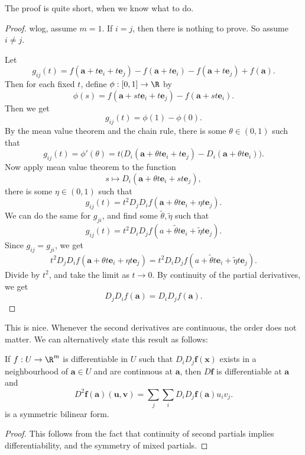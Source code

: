 \documentclass[a4paper]{article}
\begin{document}
The proof is quite short, when we know what to do.
\begin{proof}
  wlog, assume $m = 1$. If $i = j$, then there is nothing to prove. So assume $i \not =j$.

  Let
  \[
    g_{ij}(t) = f(\mathbf{a} + t \mathbf{e}_i + t \mathbf{e}_j) - f(\mathbf{a} + t \mathbf{e}_i) - f(\mathbf{a} + t \mathbf{e}_j) + f(\mathbf{a}).
  \]
  Then for each fixed $t$, define $\phi: [0, 1] \to \R$ by
  \[
    \phi(s) = f(\mathbf{a} + st \mathbf{e}_i + t \mathbf{e}_j) - f(\mathbf{a} + st \mathbf{e}_i).
  \]
  Then we get
  \[
    g_{ij}(t) = \phi(1) - \phi(0).
  \]
  By the mean value theorem and the chain rule, there is some $\theta \in (0, 1)$ such that
  \[
    g_{ij}(t) = \phi'(\theta) = t\Big(D_i(\mathbf{a} + \theta t \mathbf{e}_i + t \mathbf{e}_j) - D_i(\mathbf{a} + \theta t \mathbf{e}_i)\Big).
  \]
  Now apply mean value theorem to the function
  \[
    s \mapsto D_i (\mathbf{a} + \theta t \mathbf{e}_i + st \mathbf{e}_j),
  \]
  there is some $\eta \in (0, 1)$ such that
  \[
    g_{ij}(t) = t^2 D_j D_i f(\mathbf{a} + \theta t \mathbf{e}_i + \eta t \mathbf{e}_j).
  \]
  We can do the same for $g_{ji}$, and find some $\tilde{\theta}, \tilde{\eta}$ such that
  \[
    g_{ij}(t) = t^2 D_i D_j f(a + \tilde{\theta} t \mathbf{e}_i + \tilde{\eta} t \mathbf{e}_j).
  \]
  Since $g_{ij} = g_{ji}$, we get
  \[
    t^2 D_j D_i f(\mathbf{a} + \theta t \mathbf{e}_i + \eta t \mathbf{e}_j) = t^2 D_i D_j f(a + \tilde{\theta} t \mathbf{e}_i + \tilde{\eta} t \mathbf{e}_j).
  \]
  Divide by $t^2$, and take the limit as $t \to 0$. By continuity of the partial derivatives, we get
  \[
    D_j D_i f(\mathbf{a}) = D_i D_j f(\mathbf{a}).
  \]
\end{proof}
This is nice. Whenever the second derivatives are continuous, the order does not matter. We can alternatively state this result as follows:

\begin{prop}
  If $f: U \to \R^m$ is differentiable in $U$ such that $D_i D_j \mathbf{f}(\mathbf{x})$ exists in a neighbourhood of $\mathbf{a} \in U$ and are continuous at $\mathbf{a}$, then $D \mathbf{f}$ is differentiable at $\mathbf{a}$ and
  \[
    D^2 \mathbf{f} (\mathbf{a})(\mathbf{u}, \mathbf{v}) = \sum_j \sum_i D_i D_j \mathbf{f}(\mathbf{a}) u_i v_j.
  \]
  is a symmetric bilinear form.
\end{prop}

\begin{proof}
  This follows from the fact that continuity of second partials implies differentiability, and the symmetry of mixed partials.
\end{proof}
\end{document}
